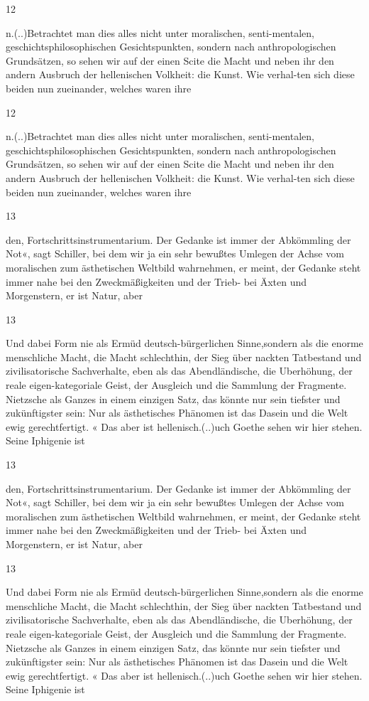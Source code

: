 \documentclass[
  letterpaper,
  DIV=11,
  numbers=noendperiod]{scrartcl}
\begin{document}
12

n.(..)Betrachtet man dies alles nicht unter moralischen, senti-mentalen,
geschichtsphilosophischen Gesichtspunkten, sondern nach
anthropologischen Grundsätzen, so sehen wir auf der einen Scite die
Macht und neben ihr den andern Ausbruch der hellenischen Volkheit: die
Kunst. Wie verhal-ten sich diese beiden nun zueinander, welches waren
ihre

12

n.(..)Betrachtet man dies alles nicht unter moralischen, senti-mentalen,
geschichtsphilosophischen Gesichtspunkten, sondern nach
anthropologischen Grundsätzen, so sehen wir auf der einen Scite die
Macht und neben ihr den andern Ausbruch der hellenischen Volkheit: die
Kunst. Wie verhal-ten sich diese beiden nun zueinander, welches waren
ihre

13

den, Fortschrittsinstrumentarium. Der Gedanke ist immer der Abkömmling
der Not«, sagt Schiller, bei dem wir ja ein sehr bewußtes Umlegen der
Achse vom moralischen zum ästhetischen Weltbild wahrnehmen, er meint,
der Gedanke steht immer nahe bei den Zweckmäßigkeiten und der Trieb- bei
Äxten und Morgenstern, er ist Natur, aber

13

Und dabei Form nie als Ermüd deutsch-bürgerlichen Sinne,sondern als die
enorme menschliche Macht, die Macht schlechthin, der Sieg über nackten
Tatbestand und zivilisatorische Sachverhalte, eben als das
Abendländische, die Uberhöhung, der reale eigen-kategoriale Geist, der
Ausgleich und die Sammlung der Fragmente. Nietzsche als Ganzes in einem
einzigen Satz, das könnte nur sein tiefster und zukünftigster sein: Nur
als ästhetisches Phänomen ist das Dasein und die Welt ewig
gerechtfertigt. « Das aber ist hellenisch.(..)uch Goethe sehen wir hier
stehen. Seine Iphigenie ist

13

den, Fortschrittsinstrumentarium. Der Gedanke ist immer der Abkömmling
der Not«, sagt Schiller, bei dem wir ja ein sehr bewußtes Umlegen der
Achse vom moralischen zum ästhetischen Weltbild wahrnehmen, er meint,
der Gedanke steht immer nahe bei den Zweckmäßigkeiten und der Trieb- bei
Äxten und Morgenstern, er ist Natur, aber

13

Und dabei Form nie als Ermüd deutsch-bürgerlichen Sinne,sondern als die
enorme menschliche Macht, die Macht schlechthin, der Sieg über nackten
Tatbestand und zivilisatorische Sachverhalte, eben als das
Abendländische, die Uberhöhung, der reale eigen-kategoriale Geist, der
Ausgleich und die Sammlung der Fragmente. Nietzsche als Ganzes in einem
einzigen Satz, das könnte nur sein tiefster und zukünftigster sein: Nur
als ästhetisches Phänomen ist das Dasein und die Welt ewig
gerechtfertigt. « Das aber ist hellenisch.(..)uch Goethe sehen wir hier
stehen. Seine Iphigenie ist
\end{document}
